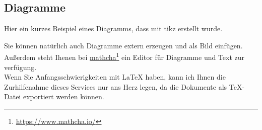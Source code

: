 \subsection{Diagramme}
    Hier ein kurzes Beispiel eines Diagramms, dass mit tikz erstellt wurde.\\[1cm]
    Sie können natürlich auch Diagramme extern erzeugen und als Bild einfügen. Außerdem steht Ihenen bei \href{https://www.mathcha.io/}{mathcha}\footnote[1]{ \href{https://www.mathcha.io/}{https://www.mathcha.io/}} ein Editor für Diagramme und Text zur verfügung.\\
    Wenn Sie Anfangsschwierigkeiten mit \LaTeX{} haben, kann ich Ihnen die Zurhilfenahme dieses Services nur ans Herz legen, da die Dokumente als TeX-Datei exportiert werden können.